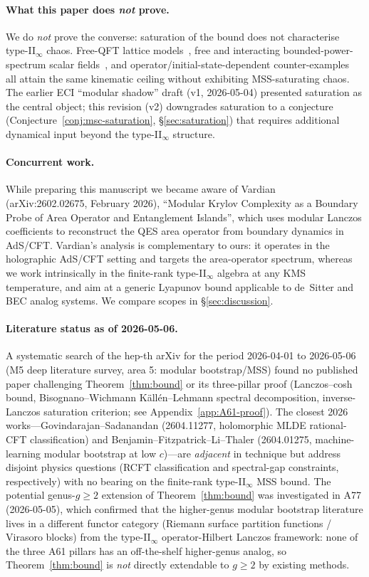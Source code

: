 \documentclass[12pt,a4paper]{article}
\begin{document}
\paragraph{What this paper does \emph{not} prove.}
We do \emph{not} prove the converse: saturation of the bound does
not characterise type-II$_\infty$ chaos.
Free-QFT lattice models~\cite{AvdoshkinDymarsky2019},
free and interacting bounded-power-spectrum scalar
fields~\cite{Camargo2023}, and operator/initial-state-dependent
counter-examples~\cite{Sreeram2025} all attain the same kinematic
ceiling without exhibiting MSS-saturating chaos.
The earlier ECI ``modular shadow'' draft (v1, 2026-05-04) presented
saturation as the central object; this revision (v2) downgrades
saturation to a conjecture (Conjecture~\ref{conj:msc-saturation},
\S\ref{sec:saturation}) that requires additional dynamical input
beyond the type-II$_\infty$ structure.

\paragraph{Concurrent work.}
While preparing this manuscript we became aware of
Vardian~\cite{Vardian2026} (arXiv:2602.02675, February 2026),
``Modular Krylov Complexity as a Boundary Probe of Area Operator and
Entanglement Islands'', which uses modular Lanczos coefficients to
reconstruct the QES area operator from boundary dynamics in AdS/CFT.
Vardian's analysis is complementary to ours: it operates in the
holographic AdS/CFT setting and targets the area-operator spectrum,
whereas we work intrinsically in the finite-rank type-II$_\infty$
algebra at any KMS temperature, and aim at a generic Lyapunov bound
applicable to de~Sitter and BEC analog systems.
We compare scopes in \S\ref{sec:discussion}.

\paragraph{Literature status as of 2026-05-06.}
A systematic search of the hep-th arXiv for the period 2026-04-01 to
2026-05-06 (M5 deep literature survey, area 5: modular bootstrap/MSS)
found no published paper challenging Theorem~\ref{thm:bound} or its
three-pillar proof (Lanczos--cosh bound, Bisognano--Wichmann
K\"{a}ll\'{e}n--Lehmann spectral decomposition, inverse-Lanczos
saturation criterion; see Appendix~\ref{app:A61-proof}).
The closest 2026 works---Govindarajan--Sadanandan (2604.11277, holomorphic
MLDE rational-CFT classification) and Benjamin--Fitzpatrick--Li--Thaler
(2604.01275, machine-learning modular bootstrap at low $c$)---are
\emph{adjacent} in technique but address disjoint physics questions (RCFT
classification and spectral-gap constraints, respectively) with no
bearing on the finite-rank type-II$_\infty$ MSS bound.
The potential genus-$g \ge 2$ extension of Theorem~\ref{thm:bound} was
investigated in A77 (2026-05-05), which confirmed that the higher-genus
modular bootstrap literature lives in a different functor category (Riemann
surface partition functions / Virasoro blocks) from the type-II$_\infty$
operator-Hilbert Lanczos framework: none of the three A61 pillars has an
off-the-shelf higher-genus analog, so Theorem~\ref{thm:bound} is
\emph{not} directly extendable to $g \ge 2$ by existing methods.
\end{document}
